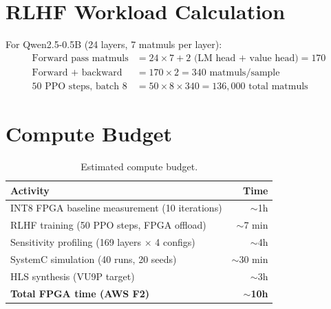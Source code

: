 \documentclass[11pt,a4paper]{article}
\begin{document}
\section{RLHF Workload Calculation}
\label{app:workload}

For Qwen2.5-0.5B (24 layers, 7 matmuls per layer):
\begin{align*}
\text{Forward pass matmuls} &= 24 \times 7 + 2 \text{ (LM head + value head)} = 170 \\
\text{Forward + backward} &= 170 \times 2 = 340 \text{ matmuls/sample} \\
\text{50 PPO steps, batch 8} &= 50 \times 8 \times 340 = 136{,}000 \text{ total matmuls}
\end{align*}


\section{Compute Budget}
\label{app:compute}

\begin{table}[h!]
\centering
\begin{tabular}{@{}lr@{}}
\toprule
\textbf{Activity} & \textbf{Time} \\
\midrule
INT8 FPGA baseline measurement (10 iterations)  & $\sim$1h \\
RLHF training (50 PPO steps, FPGA offload)      & $\sim$7 min \\
Sensitivity profiling (169 layers $\times$ 4 configs) & $\sim$4h \\
SystemC simulation (40 runs, 20 seeds)           & $\sim$30 min \\
HLS synthesis (VU9P target)                       & $\sim$3h \\
\midrule
\textbf{Total FPGA time (AWS F2)}                 & $\sim$\textbf{10h} \\
\bottomrule
\end{tabular}
\caption{Estimated compute budget.}
\label{tab:compute}
\end{table}
\end{document}
